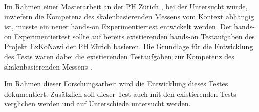 
Im Rahmen einer Masterarbeit an der PH Zürich \citep{Sichau2015a}, bei der Untersucht wurde, inwiefern die Kompetenz des skalenbasierenden Messens vom Kontext abhängig ist, musste ein neuer hands-on Experimentiertest entwickelt werden. Der hands-on Experimentiertest sollte auf bereits existierenden hands-on Testaufgaben des Projekt ExKoNawi der PH Zürich \citep{Metzger2013} basieren. Die Grundlage für die Entwicklung des Tests waren dabei die existierenden Testaufgaben zur Kompetenz des skalenbasierenden Messens \citep{Gut2013a, Metzger2013}.


Im Rahmen dieser Forschungsarbeit wird die Entwicklung dieses Testes dokumentiert. Zusätzlich soll dieser Test auch mit den existierenden Tests verglichen werden und auf Unterschiede untersucht werden.




